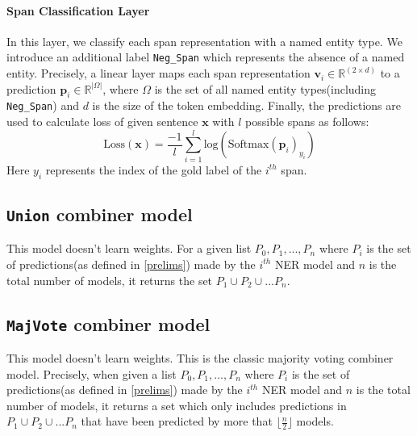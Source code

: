 \documentclass[11pt]{article}
\renewcommand{\vec}[1]{\mathbf{#1}}
\begin{document}
\paragraph{Span Classification Layer} In this layer, we classify each span
representation with a named entity type. We introduce an additional label
\verb|Neg_Span| which represents the absence of a named entity. Precisely, a
linear layer maps each span representation $\vec{v}_{i} \in \mathbb{R}^{(2
\times d)}$ to a prediction $\vec{p}_{i} \in \mathbb{R}^{|\Omega|}$, where
$\Omega$ is the set of all named entity types(including \verb|Neg_Span|) and
$d$ is the size of the token embedding. Finally, the predictions are used to
calculate loss of given sentence $\vec{x}$ with $l$ possible spans as follows:
\begin{equation} \text{Loss}(\vec{x}) =
\frac{-1}{l}\sum_{i=1}^{l}\text{log}(\text{Softmax}(\vec{p}_{i})_{y_{i}})
\end{equation} Here $y_{i}$ represents the index of the gold label of the
$i^{th}$ span.



















\subsection{\texttt{Union} combiner model}
This model doesn't learn weights. For a given list $P_{0}, P_{1}, ..., P_{n}$ where $P_{i}$ is the set of predictions(as defined in \autoref{prelims}) made by the $i^{th}$ NER model and $n$ is the total number of models, it returns the set $P_{1} \cup P_{2} \cup ... P_{n}$.   

\subsection{\texttt{MajVote} combiner model}
This model doesn't learn weights. This is the classic majority voting combiner model. Precisely,
when given a list $P_{0}, P_{1}, ..., P_{n}$ where $P_{i}$ is the set of predictions(as defined in \autoref{prelims}) made by the $i^{th}$ NER model and $n$ is the total number of models, it returns a set which only includes predictions in $P_{1} \cup P_{2} \cup ... P_{n}$ that have been predicted by more that $\lfloor\frac{n}{2}\rfloor$ models.
\end{document}
